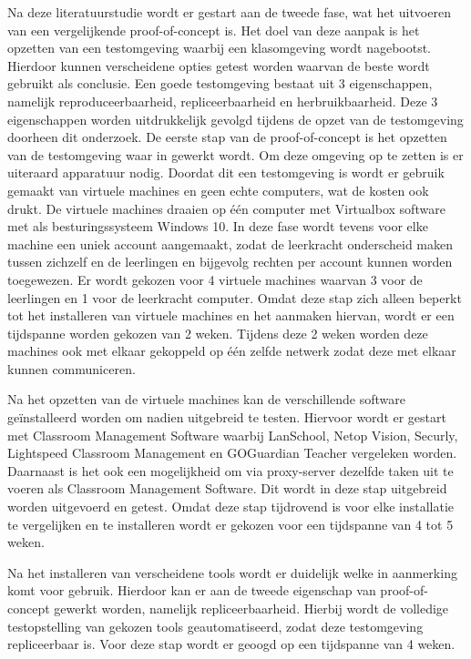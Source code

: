 Na deze literatuurstudie wordt er gestart aan de tweede fase, wat het uitvoeren van een vergelijkende proof-of-concept is. Het doel van deze aanpak is het opzetten van een testomgeving waarbij een klasomgeving wordt nagebootst. Hierdoor kunnen verscheidene opties getest worden waarvan de beste wordt gebruikt als conclusie. Een goede testomgeving bestaat uit 3 eigenschappen, namelijk reproduceerbaarheid, repliceerbaarheid en herbruikbaarheid. Deze 3 eigenschappen worden uitdrukkelijk gevolgd tijdens de opzet van de testomgeving doorheen dit onderzoek. De eerste stap van de proof-of-concept is het opzetten van de testomgeving waar in gewerkt wordt. Om deze omgeving op te zetten is er uiteraard apparatuur nodig. Doordat dit een testomgeving is wordt er gebruik gemaakt van virtuele machines en geen echte computers, wat de kosten ook drukt. De virtuele machines draaien op één computer met Virtualbox software met als besturingssysteem Windows 10. In deze fase wordt tevens voor elke machine een uniek account aangemaakt, zodat de leerkracht onderscheid maken tussen zichzelf en de leerlingen en bijgevolg rechten per account kunnen worden toegewezen. Er wordt gekozen voor 4 virtuele machines waarvan 3 voor de leerlingen en 1 voor de leerkracht computer. Omdat deze stap zich alleen beperkt tot het installeren van virtuele machines en het aanmaken hiervan, wordt er een tijdspanne worden gekozen van 2 weken. Tijdens deze 2 weken worden deze machines ook met elkaar gekoppeld op één zelfde netwerk zodat deze met elkaar kunnen communiceren. \newline

Na het opzetten van de virtuele machines kan de verschillende software geïnstalleerd worden om nadien uitgebreid te testen. Hiervoor wordt er gestart met Classroom Management Software waarbij LanSchool, Netop Vision, Securly, Lightspeed Classroom Management en GOGuardian Teacher vergeleken worden. Daarnaast is het ook een mogelijkheid om via proxy-server dezelfde taken uit te voeren als Classroom Management Software. Dit wordt in deze stap uitgebreid worden uitgevoerd en getest. Omdat deze stap tijdrovend is voor elke installatie te vergelijken en te installeren wordt er gekozen voor een tijdspanne van 4 tot 5 weken.  \newline

Na het installeren van verscheidene tools wordt er duidelijk welke in aanmerking komt voor gebruik. Hierdoor kan er aan de tweede eigenschap van proof-of-concept gewerkt worden, namelijk repliceerbaarheid. Hierbij wordt de volledige testopstelling van gekozen tools geautomatiseerd, zodat deze testomgeving repliceerbaar is. Voor deze stap wordt er geoogd op een tijdspanne van 4 weken. \newline

